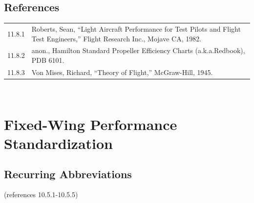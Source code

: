 \documentclass[
]{book}
\begin{document}
\hypertarget{references}{%
\section{References}\label{references}}

\begin{longtable}[]{@{}ll@{}}
\toprule
\endhead
\begin{minipage}[t]{0.10\columnwidth}\raggedright
11.8.1\strut
\end{minipage} & \begin{minipage}[t]{0.84\columnwidth}\raggedright
Roberts, Sean, ``Light Aircraft Performance for Test Pilots and Flight Test Engineers,'' Flight Research Inc., Mojave CA, 1982.\strut
\end{minipage}\tabularnewline
\begin{minipage}[t]{0.10\columnwidth}\raggedright
11.8.2\strut
\end{minipage} & \begin{minipage}[t]{0.84\columnwidth}\raggedright
anon., Hamilton Standard Propeller Efficiency Charts (a.k.a.Redbook), PDB 6101.\strut
\end{minipage}\tabularnewline
\begin{minipage}[t]{0.10\columnwidth}\raggedright
11.8.3\strut
\end{minipage} & \begin{minipage}[t]{0.84\columnwidth}\raggedright
Von Mises, Richard, ``Theory of Flight,'' McGraw-Hill, 1945.\strut
\end{minipage}\tabularnewline
\bottomrule
\end{longtable}

~

\hypertarget{fixed-wing-performance-standardization}{%
\chapter{Fixed-Wing Performance Standardization}\label{fixed-wing-performance-standardization}}

\hypertarget{recurring-abbreviations}{%
\section{Recurring Abbreviations}\label{recurring-abbreviations}}

(references 10.5.1-10.5.5)
\end{document}
